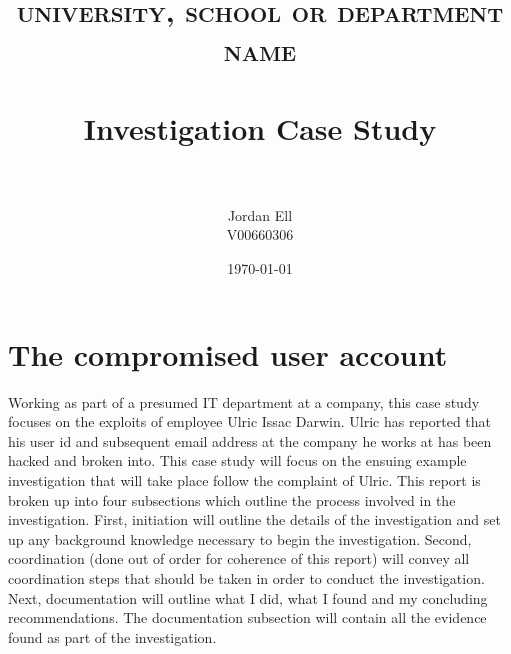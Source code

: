 \documentclass[paper=a4, fontsize=11pt]{scrartcl} %
\title{	
\normalfont \normalsize 
\textsc{university, school or department name} \\ [25pt] %
\horrule{0.5pt} \\[0.4cm] %
\huge Investigation Case Study \\ %
\horrule{2pt} \\[0.5cm] %
}
\author{Jordan Ell \\ V00660306} %
\date{\normalsize\today} %
\numberwithin{equation}{section} %
\numberwithin{figure}{section} %
\numberwithin{table}{section} %
\begin{document}
\maketitle %


\section{The compromised user account}
Working as part of a presumed IT department at a company, this case study focuses on the 
exploits of employee Ulric Issac Darwin. Ulric has reported that his user id and subsequent
email address at the company he works at has been hacked and broken into. This case study
will focus on the ensuing example investigation that will take place follow the complaint
of Ulric. This report is broken up into four subsections which outline the process involved
in the investigation. First, initiation will outline the details of the investigation and
set up any background knowledge necessary to begin the investigation. Second, coordination
(done out of order for coherence of this report) will convey all coordination steps that should
be taken in order to conduct the investigation. Next, documentation will outline what I did,
what I found and my concluding recommendations. The documentation subsection will contain
all the evidence found as part of the investigation.

\end{document}
